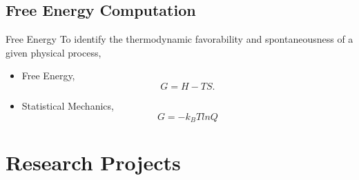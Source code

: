 \documentclass{beamer}
\begin{document}
\subsection{Free Energy Computation}
\begin{frame}{Free Energy}
To identify the thermodynamic favorability and spontaneousness of a given physical process, 
\vspace{1cm}
\begin{itemize}
	\item 
	Free Energy, 
	\begin{equation}
	G = H - TS. 
	\end{equation}

	\item Statistical Mechanics, 
	\begin{equation}
	G = - k_B T ln Q
	\end{equation}
\end{itemize}	

\end{frame}





\section{Research Projects}
\end{document}
